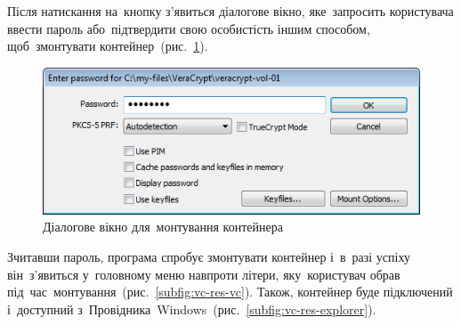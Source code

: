 \documentclass[
	a4paper,
	oneside,
	BCOR = 10mm,
	DIV = 12,
	12pt,
	headings = normal,
]{scrartcl}
\begin{document}
		Після натискання на~кнопку з'явиться діалогове вікно, яке~запросить користувача ввести пароль або~підтвердити свою особистість іншим способом, щоб~змонтувати контейнер~(рис.~\ref{fig:vc-password-prompt}).

		\begin{figure}[!htbp]
			\centering
			\includegraphics[height = 6 \baselineskip]{./assets/13.png}
			\caption{Діалогове вікно для~монтування контейнера}
			\label{fig:vc-password-prompt}
		\end{figure}

		Зчитавши пароль, програма спробує змонтувати контейнер і~в~разі успіху він~з'явиться у~головному меню навпроти літери, яку~користувач обрав під~час~монтування~(рис.~\ref{subfig:vc-res-vc}). Також, контейнер буде підключений і~доступний з~Провідника~\textenglish{Windows}~(рис.~\ref{subfig:vc-res-explorer}).
\end{document}
